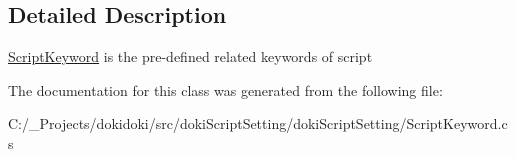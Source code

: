 \subsection{Detailed Description}
\hyperlink{classdoki_script_setting_1_1_script_keyword}{Script\+Keyword} is the pre-\/defined related keywords of script 



The documentation for this class was generated from the following file\+:\begin{DoxyCompactItemize}
\item 
C\+:/\+\_\+\+Projects/dokidoki/src/doki\+Script\+Setting/doki\+Script\+Setting/Script\+Keyword.\+cs\end{DoxyCompactItemize}
